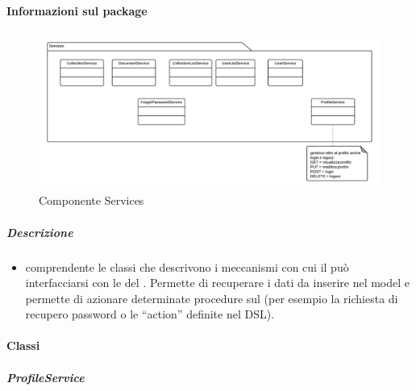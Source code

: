 	\paragraph{Informazioni sul package} 
		\begin{figure}[H] 
			\begin{center} 
				\includegraphics[width=\textwidth]{uml/package/Front-end::Services.png}  
				\caption{Componente Services}
			\end{center}  
		\end{figure} 
	\subparagraph{Descrizione} 
		\begin{itemize}
		\item[]  comprendente le classi che descrivono i meccanismi con cui il  può interfacciarsi con le  del . Permette di recuperare i dati da inserire nel model e permette di azionare determinate procedure sul  (per esempio la richiesta di recupero password o le ``action'' definite nel DSL).
		\end{itemize} 
		\paragraph{Classi}
			\subparagraph{ProfileService}
				
